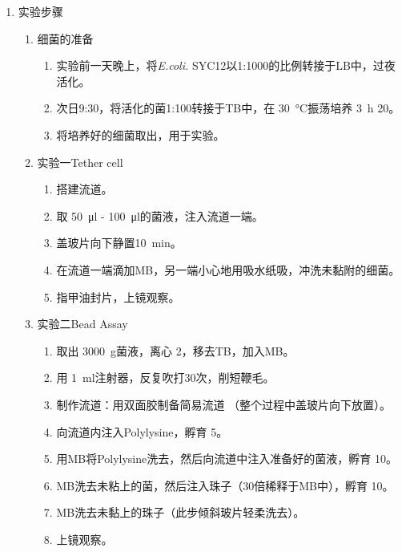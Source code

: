\documentclass[a4paper]{article}
\begin{document}
\begin{enumerate}[label=\chinese*.,left=0pt]
    \item 实验步骤
    \begin{enumerate}[label = \arabic*., left = 0pt]
        \item 细菌的准备
        \begin{enumerate}[label = 1.\arabic*., left =0pt]
            \item 实验前一天晚上，将\textit{E.coli.} SYC12以1:1000的比例转接于LB中，过夜活化。
            \item 次日9:30，将活化的菌1:100转接于TB中，在 \qty{30}{\degreeCelsius}振荡培养 \qty{3}{\hour} \qty{20}{\min}。
            \item 将培养好的细菌取出，用于实验。
        \end{enumerate}
        \item 实验一Tether cell
        \begin{enumerate}[label = 2.\arabic*., left =0pt]
            \item 搭建流道。
            \item 取 \qty{50}{\ul} - \qty{100}{\ul}的菌液，注入流道一端。
            \item 盖玻片向下静置\qty{10}{\minute}。
            \item 在流道一端滴加MB，另一端小心地用吸水纸吸，冲洗未黏附的细菌。
            \item 指甲油封片，上镜观察。
        \end{enumerate}
        \item 实验二Bead Assay
        \begin{enumerate}[label = 3.\arabic*., left =0pt]
            \item 取出 \qty{3000}{\g}菌液，离心 \qty{2}{\min}，移去TB，加入MB。
            \item 用 \qty{1}{\ml}注射器，反复吹打30次，削短鞭毛。
            \item 制作流道：用双面胶制备简易流道 （整个过程中盖玻片向下放置）。
            \item 向流道内注入Polylysine，孵育 \qty{5}{\min}。
            \item 用MB将Polylysine洗去，然后向流道中注入准备好的菌液，孵育 \qty{10}{\min}。
            \item MB洗去未粘上的菌，然后注入珠子（30倍稀释于MB中），孵育 \qty{10}{\min}。
            \item MB洗去未黏上的珠子（此步倾斜玻片轻柔洗去）。
            \item 上镜观察。

        \end{enumerate}
    \end{enumerate}


\end{enumerate}
\end{document}
